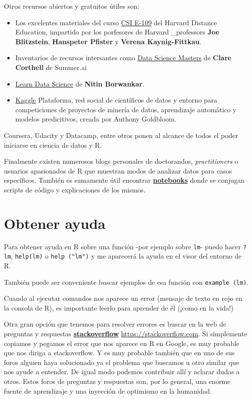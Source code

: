 \documentclass[]{book}
\theoremstyle{definition}
\theoremstyle{definition}
\theoremstyle{remark}
\begin{document}
Otros recursos abiertos y gratuitos útiles son:

\begin{itemize}
\item
  Los excelentes materiales del curso
  \href{http://cm.dce.harvard.edu/2014/01/14328/publicationListing.shtml}{CSI
  E-109} del Harvard Distance Education, impartido por los porfesores de
  Harvard \_professors \textbf{Joe Blitzstein}, \textbf{Hanspeter
  Pfister} y \textbf{Verena Kaynig-Fittkau}.
\item
  Inventarios de recursos intersantes como
  \href{http://datasciencemasters.org}{Data Science Masters} de
  \textbf{Clare Corthell} de Summer.ai
\item
  \href{http://learnds.com/}{Learn Data Science} de \textbf{Nitin
  Borwankar}.
\item
  \href{https://www.kaggle.com}{Kaggle} Plataforma, red social de
  científicos de datos y entorno para competiciones de proyectos de
  minería de datos, aprendizaje automático y modelos predicitivos,
  creada por Anthony Goldbloom.
\end{itemize}

Coursera, Udacity y Datacamp, entre otros ponen al alcance de todos el
poder iniciarse en ciencia de datos y R.

Finalmente existen numerosos blogs personales de doctorandos,
\emph{practitioners} o usuarios apasionados de R que muestran modos de
analizar datos para casos específicos. También es sumamente útil
encontrar
\href{http://rmarkdown.rstudio.com/r_notebooks.html}{\textbf{notebooks}}
donde se conjugan scripts de código y explicaciones de los mismos.

\section{Obtener ayuda}\label{obtener-ayuda}

Para obtener ayuda en R sobre una función -por ejemplo sobre
\texttt{lm}- puedo hacer \texttt{?lm}, \texttt{help(lm)} o
\texttt{help\ ("lm")} y me aparecerá la ayuda en el visor del entorno de
R.

También puede ser conveniente buscar ejemplos de esa función con
\texttt{example\ (lm)}.

Cuando al ejecutar comandos nos aparece un error (mensaje de texto en
rojo en la consola de R), es importante leerlo para aprender de él
(¡como en la vida!)

Otra gran opción que tenemos para resolver errores es buscar en la web
de preguntas y respuestas
\href{https://stackoverflow.com}{\textbf{stackoverflow}}
\url{https://stackoverflow.com}. Si simplemente copiamos y pegamos el
error que nos aparece en R en Google, es muy probable que nos diriga a
stackoverflow. Y es muy probable también que en uno de sus foros alguien
haya solucionado ya el problema que buscamos u otro similar que nos
ayude a entender. De igual modo podemos contribuir allí y aclarar dudas
a otros. Estos foros de preguntas y respuestas son, por lo general, una
enorme fuente de aprendizaje y una inyección de optimismo en la
humanidad.
\end{document}
